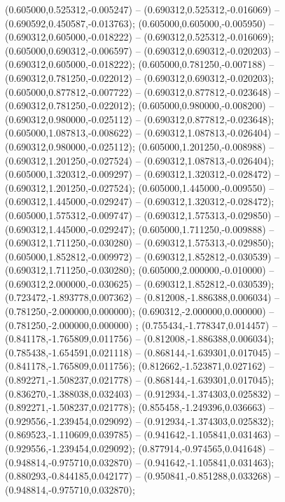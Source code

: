  (0.605000,0.525312,-0.005247) -- (0.690312,0.525312,-0.016069) -- (0.690592,0.450587,-0.013763);
 (0.605000,0.605000,-0.005950) -- (0.690312,0.605000,-0.018222) -- (0.690312,0.525312,-0.016069);
 (0.605000,0.690312,-0.006597) -- (0.690312,0.690312,-0.020203) -- (0.690312,0.605000,-0.018222);
 (0.605000,0.781250,-0.007188) -- (0.690312,0.781250,-0.022012) -- (0.690312,0.690312,-0.020203);
 (0.605000,0.877812,-0.007722) -- (0.690312,0.877812,-0.023648) -- (0.690312,0.781250,-0.022012);
 (0.605000,0.980000,-0.008200) -- (0.690312,0.980000,-0.025112) -- (0.690312,0.877812,-0.023648);
 (0.605000,1.087813,-0.008622) -- (0.690312,1.087813,-0.026404) -- (0.690312,0.980000,-0.025112);
 (0.605000,1.201250,-0.008988) -- (0.690312,1.201250,-0.027524) -- (0.690312,1.087813,-0.026404);
 (0.605000,1.320312,-0.009297) -- (0.690312,1.320312,-0.028472) -- (0.690312,1.201250,-0.027524);
 (0.605000,1.445000,-0.009550) -- (0.690312,1.445000,-0.029247) -- (0.690312,1.320312,-0.028472);
 (0.605000,1.575312,-0.009747) -- (0.690312,1.575313,-0.029850) -- (0.690312,1.445000,-0.029247);
 (0.605000,1.711250,-0.009888) -- (0.690312,1.711250,-0.030280) -- (0.690312,1.575313,-0.029850);
 (0.605000,1.852812,-0.009972) -- (0.690312,1.852812,-0.030539) -- (0.690312,1.711250,-0.030280);
 (0.605000,2.000000,-0.010000) -- (0.690312,2.000000,-0.030625) -- (0.690312,1.852812,-0.030539);
 (0.723472,-1.893778,0.007362) -- (0.812008,-1.886388,0.006034) -- (0.781250,-2.000000,0.000000);
 (0.690312,-2.000000,0.000000) -- (0.781250,-2.000000,0.000000) ;
 (0.755434,-1.778347,0.014457) -- (0.841178,-1.765809,0.011756) -- (0.812008,-1.886388,0.006034);
 (0.785438,-1.654591,0.021118) -- (0.868144,-1.639301,0.017045) -- (0.841178,-1.765809,0.011756);
 (0.812662,-1.523871,0.027162) -- (0.892271,-1.508237,0.021778) -- (0.868144,-1.639301,0.017045);
 (0.836270,-1.388038,0.032403) -- (0.912934,-1.374303,0.025832) -- (0.892271,-1.508237,0.021778);
 (0.855458,-1.249396,0.036663) -- (0.929556,-1.239454,0.029092) -- (0.912934,-1.374303,0.025832);
 (0.869523,-1.110609,0.039785) -- (0.941642,-1.105841,0.031463) -- (0.929556,-1.239454,0.029092);
 (0.877914,-0.974565,0.041648) -- (0.948814,-0.975710,0.032870) -- (0.941642,-1.105841,0.031463);
 (0.880293,-0.844185,0.042177) -- (0.950841,-0.851288,0.033268) -- (0.948814,-0.975710,0.032870);
